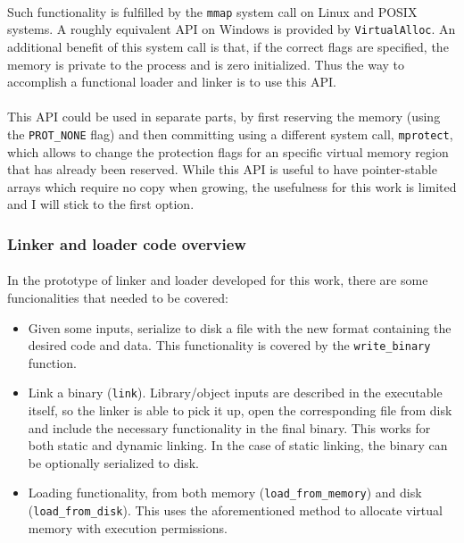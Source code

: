 \documentclass[12pt]{article}
\begin{document}
	\paragraph{}Such functionality is fulfilled by the \verb|mmap| system call on Linux\cite{mmap} and POSIX systems. A roughly equivalent API on Windows is provided by \verb|VirtualAlloc|\cite{virtual-alloc}. An additional benefit of this system call is that, if the correct flags are specified, the memory is private to the process and is zero initialized. Thus the way to accomplish a functional loader and linker is to use this API.
	\paragraph{}This API could be used in separate parts, by first reserving the memory (using the \verb|PROT_NONE| flag) and then committing using a different system call, \verb|mprotect|, which allows to change the protection flags for an specific virtual memory region that has already been reserved. While this API is useful to have pointer-stable arrays which require no copy when growing, the usefulness for this work 
	is limited and I will stick to the first option.
	
	\subsubsection{Linker and loader code overview}
	
	\paragraph{}In the prototype of linker and loader developed for this work, there are some funcionalities that needed to be covered:
	\begin{itemize}
		\item Given some inputs, serialize to disk a file with the new format containing the desired code and data. This functionality is covered by the \verb|write_binary| function.
		\item Link a binary (\verb|link|). Library/object inputs are described in the executable itself, so the linker is able to pick it up, open the corresponding file from disk and include the necessary functionality in the final binary. This works for both static and dynamic linking. In the case of static linking, the binary can be optionally serialized to disk.
		\item Loading functionality, from both memory (\verb|load_from_memory|) and disk (\verb|load_from_disk|). This uses the aforementioned method to allocate virtual memory with execution permissions.

	\end{itemize}
\end{document}
